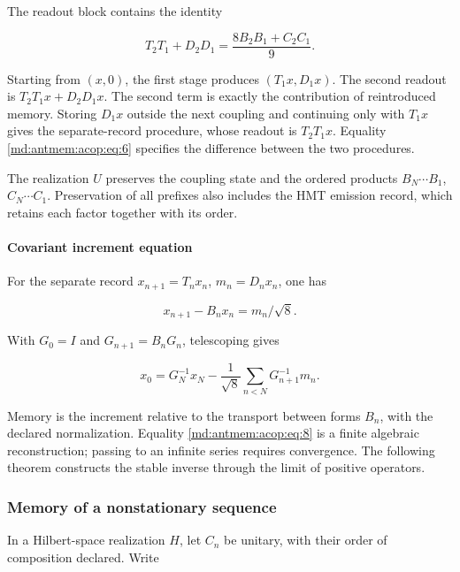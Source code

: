 The readout block contains the identity

\begin{equation}
\boxed{T_2T_1+D_2D_1=\frac{8B_2B_1+C_2C_1}{9}.}
\label{md:antmem:acop:eq:6}
\end{equation}

Starting from \((x,0)\), the first stage produces \((T_1x,D_1x)\). The second readout is \(T_2T_1x+D_2D_1x\). The second term is exactly the contribution of reintroduced memory. Storing \(D_1x\) outside the next coupling and continuing only with \(T_1x\) gives the separate-record procedure, whose readout is \(T_2T_1x\). Equality \eqref{md:antmem:acop:eq:6} specifies the difference between the two procedures.

The realization \(U\) preserves the coupling state and the ordered products \(B_N\cdots B_1\), \(C_N\cdots C_1\). Preservation of all prefixes also includes the HMT emission record, which retains each factor together with its order.

\paragraph{Covariant increment equation}

For the separate record \(x_{n+1}=T_nx_n\), \(m_n=D_nx_n\), one has

\begin{equation}
x_{n+1}-B_nx_n=m_n/\sqrt8.
\label{md:antmem:acop:eq:7}
\end{equation}

With \(G_0=I\) and \(G_{n+1}=B_nG_n\), telescoping gives

\begin{equation}
x_0=G_N^{-1}x_N-\frac1{\sqrt8}\sum_{n<N}G_{n+1}^{-1}m_n.
\label{md:antmem:acop:eq:8}
\end{equation}

Memory is the increment relative to the transport between forms \(B_n\), with the declared normalization. Equality \eqref{md:antmem:acop:eq:8} is a finite algebraic reconstruction; passing to an infinite series requires convergence. The following theorem constructs the stable inverse through the limit of positive operators.

\subsubsection{Memory of a nonstationary sequence}

In a Hilbert-space realization \(H\), let \(C_n\) be unitary, with their order of composition declared. Write

